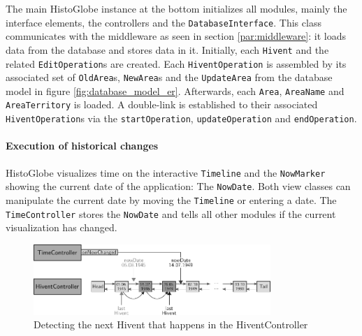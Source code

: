 The main HistoGlobe instance at the bottom initializes all modules, mainly the interface elements, the controllers and the \texttt{DatabaseInterface}. This class communicates with the middleware as seen in section \ref{par:middleware}: it loads data from the database and stores data in it. Initially, each \texttt{Hivent} and the related \texttt{EditOperation}s are created. Each \texttt{HiventOperation} is assembled by its associated set of \texttt{OldArea}s, \texttt{NewArea}s and the \texttt{UpdateArea} from the database model in  figure \ref{fig:database_model_er}. Afterwards, each \texttt{Area}, \texttt{AreaName} and \texttt{AreaTerritory} is loaded. A double-link is established to their associated \texttt{HiventOperation}s via the \texttt{startOperation}, \texttt{updateOperation} and \texttt{endOperation}.


\paragraph{Execution of historical changes} %
\label{par:executing_historical_changes}

HistoGlobe visualizes time on the interactive \texttt{Timeline} and the \texttt{NowMarker} showing the current date of the application: The \texttt{NowDate}. Both view classes can manipulate the current date by moving the \texttt{Timeline} or entering a date. The \texttt{TimeController} stores the \texttt{NowDate} and tells all other modules if the current visualization has changed.

\begin{figure}[ht]
  \vspace{1em}
  \centering
  \includegraphics[width=0.8\textwidth]{graphics/development/implementation/hivent_controller}
  \caption{Detecting the next Hivent that happens in the HiventController}
  \label{fig:hivent_controller}
\end{figure}

